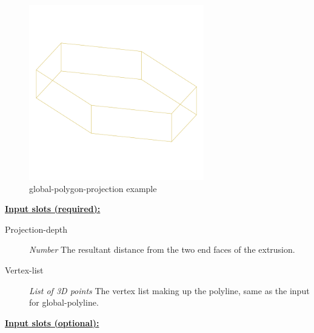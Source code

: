 \documentclass [11pt]{book}
\begin{document}
\begin{itemize}
\begin{figure}
\label{fig:example-code-global-polygon-projection}

\end{figure}

\begin{figure}
\begin{center}
\includegraphics[width=3in,height=3in]{../images/example-global-polygon-projection.pdf}
\end{center}

\caption{global-polygon-projection example}

\label{fig:global-polygon-projection}

\end{figure}





\textbf{
\underline{Input slots (required):}}

\begin{description}

\item [Projection-depth]
\emph{Number} The resultant distance from the two end faces of the extrusion.


\item [Vertex-list]
\emph{List of 3D points} The vertex list making up the polyline, same as the input for global-polyline.


\end{description}






\textbf{
\underline{Input slots (optional):}}

\begin{description}


\end{description}
\end{itemize}
\end{document}
